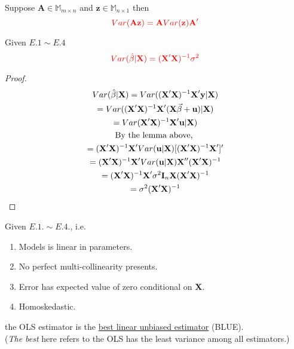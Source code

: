 \documentclass[]{article}
\begin{document}
    	\begin{lemma}
    		Suppose $\textbf{A} \in \mathbb{M}_{m\times n}$ and $\textbf{z} \in \mathbb{M}_{n\times 1}$ then 
    		\[
    			\textcolor{red}{
    				Var(\textbf{A} \textbf{z}) = \textbf{A} Var(\textbf{z}) \textbf{A}'
    			}
    		\]
    	\end{lemma}
    	\begin{theorem}
    		Given $E.1 \sim E.4$
    		\[
    			\textcolor{red}{
    				Var(\hat{\beta}|\textbf{X}) = (\textbf{X}' \textbf{X})^{-1} \sigma^2
    			}
    		\]
    	\end{theorem}
    	\begin{proof}
    		\begin{gather*}
    			Var(\hat{\beta}|\textbf{X}) = Var((\textbf{X}'\textbf{X})^{-1} \textbf{X}' \textbf{y} | \textbf{X}) \\ 
    			= Var((\textbf{X}'\textbf{X})^{-1} \textbf{X}'(\textbf{X}\vec{\beta} + \textbf{u})|\textbf{X}) \\
    			= Var(\textbf{X}'\textbf{X})^{-1} \textbf{X}'\textbf{u}|\textbf{X}) \\
    			\text{{By the lemma above, }} \\
    			= (\textbf{X}'\textbf{X})^{-1} \textbf{X}' Var(\textbf{u}|\textbf{X}) [(\textbf{X}'\textbf{X})^{-1} \textbf{X}']' \\
    			= (\textbf{X}'\textbf{X})^{-1} \textbf{X}' Var(\textbf{u}|\textbf{X}) \textbf{X}'' (\textbf{X}'\textbf{X})^{-1} \\
    			= (\textbf{X}'\textbf{X})^{-1} \textbf{X}' \sigma^2 \textbf{I}_n \textbf{X} (\textbf{X}'\textbf{X})^{-1} \\
    			= \sigma^2 (\textbf{X}'\textbf{X})^{-1}
    		\end{gather*}
    	\end{proof}
    	
    	\begin{theorem}
    		Given $E.1. \sim E.4.$, i.e.
    			\begin{enumerate}
    				\item Models is linear in parameters.
    				\item No perfect multi-collinearity presents.
    				\item Error has expected value of zero conditional on \textbf{X}.
    				\item Homoskedastic.
    			\end{enumerate}
    		the OLS estimator is the \ul{best linear unbiased estimator} (BLUE). \\(\emph{The best} here refers to the OLS has the least variance among all estimators.)
    	\end{theorem}
    	
\end{document}
